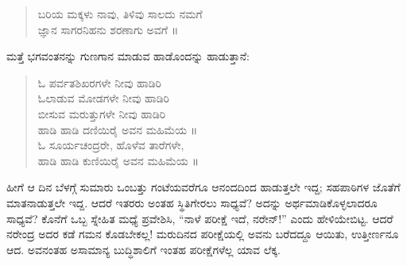 \begin{verse}
ಬರಿಯ ಮಕ್ಕಳು ನಾವು, ತಿಳಿವು ಸಾಲದು ನಮಗೆ\\ಜ್ಞಾನ ಸಾಗರನಿಹನು ಶರಣಾಗು ಅವಗೆ ॥
\end{verse}

\noindent

ಮತ್ತೆ ಭಗವಂತನನ್ನು ಗುಣಗಾನ ಮಾಡುವ ಹಾಡೊಂದನ್ನು ಹಾಡುತ್ತಾನೆ:

\begin{verse}
ಓ ಪರ್ವತಶಿಖರಗಳೇ ನೀವು ಹಾಡಿರಿ\\ಓಲಾಡುವ ಮೋಡಗಳೇ ನೀವು ಹಾಡಿರಿ\\ಬೀಸುವ ಮರುತ್ತುಗಳೇ ನೀವು ಹಾಡಿರಿ\\ಹಾಡಿ ಹಾಡಿ ದಣಿಯಿರೈ ಅವನ ಮಹಿಮೆಯ ॥\\ಓ ಸೂರ್ಯಚಂದ್ರರೇ, ಹೊಳೆವ ತಾರೆಗಳೇ, \\ಹಾಡಿ ಹಾಡಿ ಕುಣಿಯಿರೈ ಅವನ ಮಹಿಮೆಯ ॥
\end{verse}

\noindent

ಹೀಗೆ ಆ ದಿನ ಬೆಳಗ್ಗೆ ಸುಮಾರು ಒಂಬತ್ತು ಗಂಟೆಯವರೆಗೂ ಆನಂದದಿಂದ ಹಾಡುತ್ತಲೇ ಇದ್ದ; ಸಹಪಾಠಿಗಳ ಜೊತೆಗೆ ಮಾತನಾಡುತ್ತಲೇ ಇದ್ದ. ಆದರೆ ಇತರರು ಅಂತಹ ಸ್ಥಿತಿಗೇರಲು ಸಾಧ್ಯವೆ? ಅದನ್ನು ಅರ್ಥಮಾಡಿಕೊಳ್ಳಲಾದರೂ ಸಾಧ್ಯವೆ? ಕೊನೆಗೆ ಒಬ್ಬ ಸ್ನೇಹಿತ ಮಧ್ಯೆ ಪ್ರವೇಶಿಸಿ, “ನಾಳೆ ಪರೀಕ್ಷೆ ಇದೆ, ನರೇನ್!” ಎಂದು ಹೇಳಿಯೇಬಿಟ್ಟ. ಆದರೆ ನರೇಂದ್ರ ಅದರ ಕಡೆ ಗಮನ ಕೊಡಬೇಕಲ್ಲ! ಮರುದಿನದ ಪರೀಕ್ಷೆಯಲ್ಲಿ ಅವನು ಬರೆದದ್ದೂ ಆಯಿತು, ಉತ್ತೀರ್ಣನೂ ಆದ. ಅವನಂತಹ ಅಸಾಮಾನ್ಯ ಬುದ್ಧಿಶಾಲಿಗೆ ಇಂತಹ ಪರೀಕ್ಷೆಗಳೆಲ್ಲ ಯಾವ ಲೆಕ್ಕ.

